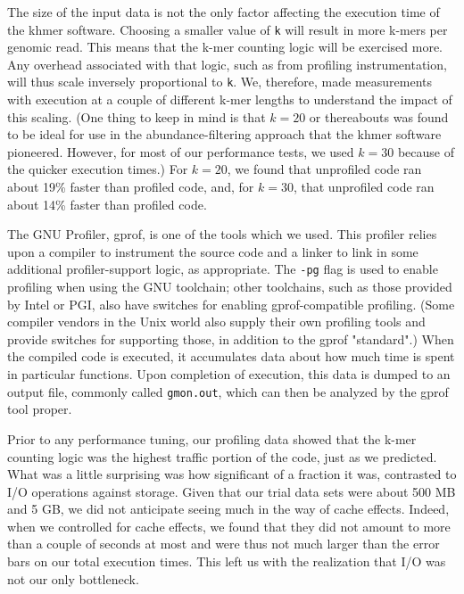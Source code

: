 \documentclass{article}
\begin{document}
The size of the input data is not the only factor affecting the execution time of the khmer software. Choosing a smaller value of \texttt{k} will result in more k-mers per genomic read. This means that the k-mer counting logic will be exercised more. Any overhead associated with that logic, such as from profiling instrumentation, will thus scale inversely proportional to \texttt{k}. We, therefore, made measurements with execution at a couple of different k-mer lengths to understand the impact of this scaling. (One thing to keep in mind is that $k = 20$ or thereabouts was found to be ideal for use in the abundance-filtering approach that the khmer software pioneered. However, for most of our performance tests, we used $k = 30$ because of the quicker execution times.) For $k = 20$, we found that unprofiled code ran about 19\% faster than profiled code, and, for $k = 30$, that unprofiled code ran about 14\% faster than profiled code.


The GNU Profiler, gprof, is one of the tools which we used. This profiler relies upon a compiler to instrument the source code and a linker to link in some additional profiler-support logic, as appropriate. The \texttt{-pg} flag is used to enable profiling when using the GNU toolchain; other toolchains, such as those provided by Intel or PGI, also have switches for enabling gprof-compatible profiling. (Some compiler vendors in the Unix world also supply their own profiling tools and provide switches for supporting those, in addition to the gprof "standard".) When the compiled code is executed, it accumulates data about how much time is spent in particular functions. Upon completion of execution, this data is dumped to an output file, commonly called \texttt{gmon.out}, which can then be analyzed by the gprof tool proper.

Prior to any performance tuning, our profiling data showed that the k-mer counting logic was the highest traffic portion of the code, just as we predicted. What was a little surprising was how significant of a fraction it was, contrasted to I/O operations against storage. Given that our trial data sets were about 500 MB and 5 GB, we did not anticipate seeing much in the way of cache effects. Indeed, when we controlled for cache effects, we found that they did not amount to more than a couple of seconds at most and were thus not much larger than the error bars on our total execution times. This left us with the realization that I/O was not our only bottleneck.
\end{document}
